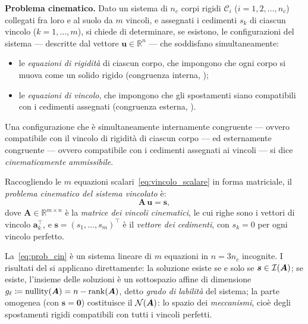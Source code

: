 \textbf{Problema cinematico.}
Dato un sistema di $n_c$ corpi rigidi $\mathcal{C}_i$
($i = 1, 2, \dots, n_c$) collegati fra loro e al suolo
da $m$ vincoli, e assegnati i cedimenti $s_k$ di ciascun
vincolo ($k = 1, \dots, m$), si chiede di determinare,
se esistono, le configurazioni del sistema --- descritte
dal vettore $\bm{u} \in \mathbb{R}^n$ --- che soddisfano
simultaneamente:
\begin{itemize}[noitemsep]
	\item le \emph{equazioni di rigidità} di ciascun corpo,	che impongono che ogni corpo si muova come un solido
	rigido (congruenza interna, );
	\item le \emph{equazioni di vincolo}, che impongono che	gli spostamenti siano compatibili con i cedimenti
	assegnati (congruenza esterna, ).
\end{itemize}
Una configurazione che è simultaneamente internamente
congruente --- ovvero compatibile con il vincolo di
rigidità di ciascun corpo --- ed esternamente congruente
--- ovvero compatibile con i cedimenti assegnati ai
vincoli --- si dice \emph{cinematicamente ammissibile}.

Raccogliendo le $m$ equazioni
scalari~\eqref{eq:vincolo_scalare} in forma matriciale,
il \emph{problema cinematico del sistema vincolato} è:
\begin{equation}\label{eq:prob_cin}
	\boxed{\bm{A}\,\bm{u} = \bm{s},}
\end{equation}
dove $\bm{A} \in \mathbb{R}^{m\times n}$ è la
\emph{matrice dei vincoli cinematici}, le cui righe sono
i vettori di vincolo $\bm{a}_k^{\top}$, e
$\bm{s} = (s_1, \dots, s_m)^{\top}$ è il
\emph{vettore dei cedimenti}, con $s_k = 0$ per ogni
vincolo perfetto.

La~\eqref{eq:prob_cin} è un sistema lineare di $m$ equazioni in $n = 3 n_c$ incognite. I risultati del  si
applicano direttamente: la soluzione esiste se e solo se $\bm{s} \in \mathcal{I}(\bm{A})$; se esiste, l'insieme delle
soluzioni è un sottospazio affine di dimensione	$g_\ell \coloneqq \operatorname{nullity}(\bm{A}) = n - \operatorname{rank}(\bm{A})$, detto
\emph{grado di labilità} del sistema; la parte omogenea	(con $\bm{s} = \bm{0}$) costituisce il $\mathcal{N}(\bm{A})$:
lo spazio dei \emph{meccanismi}, cioè degli spostamenti	rigidi compatibili con tutti i vincoli perfetti.



